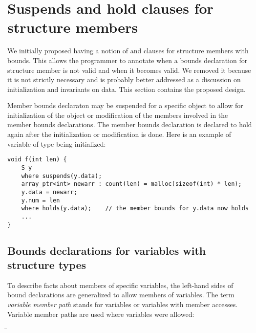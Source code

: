 \section{Suspends and hold clauses for structure members}

We initially proposed having a notion of  and  clauses
for structure members with bounds.  This allows the programmer to annotate when
a bounds declaration for structure member is not valid and when it becomes valid.
We removed it because it is not strictly necessary and is probably better addressed
as a discussion on initialization and invariants on data.   This section contains
the proposed design.

Member bounds declaraton may be suspended for a specific
object to allow for initialization of the object or modification of the
members involved in the member bounds declarations. The member bounds
declaration is declared to hold again after the initialization or modification is done.
Here is an example of variable of type  being initialized:

\begin{lstlisting}
void f(int len) {
    S y 
    where suspends(y.data);
    array_ptr<int> newarr : count(len) = malloc(sizeof(int) * len);
    y.data = newarr;
    y.num = len
    where holds(y.data);    // the member bounds for y.data now holds
    ...
}
\end{lstlisting}

\subsection{Bounds declarations for variables with structure types}

To describe facts about members of specific variables, the left-hand
sides of bound declarations are generalized to allow members of
variables. The term \emph{variable member path} stands for variables or
variables with member accesses. Variable member paths are used where
variables were allowed:
\begin{tabbing}
\=\\
\>  \code{:}  \\
\\
 \\
\>  \\
\>   
\end{tabbing}

